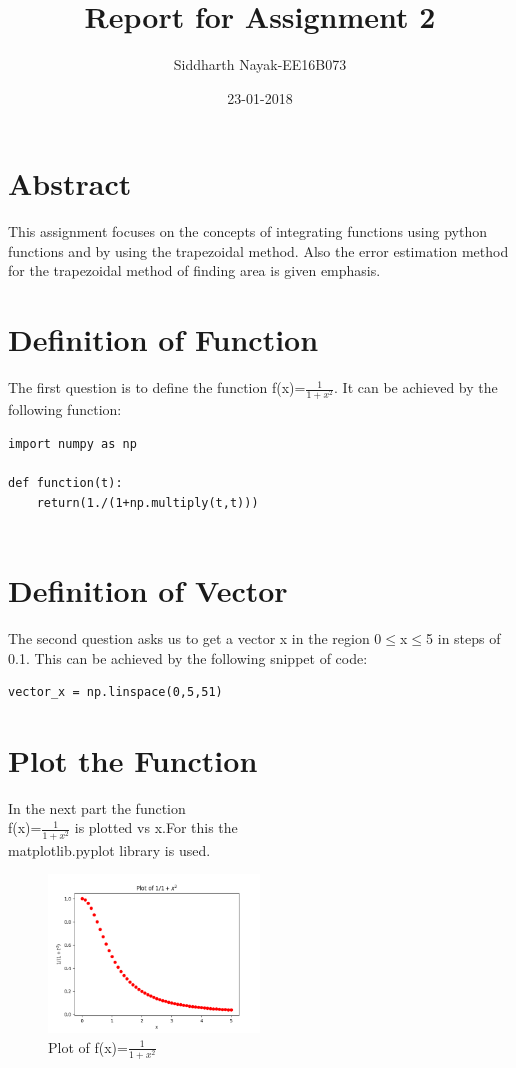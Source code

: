 \documentclass[11pt, a3paper, twocolumn]{article}
\title{Report for Assignment 2}
\date{23-01-2018}
\author{Siddharth Nayak-EE16B073}
\begin{document}
\maketitle
{}
\section{Abstract}
This assignment focuses on the concepts of integrating functions using python functions and by using the trapezoidal method. Also the error estimation method for the trapezoidal method of finding area is given emphasis.

\section{Definition of Function}
The first question is to define the function f(x)=$\frac{1}{1+x^2}$.
It can be achieved by the following function:
\begin{verbatim}
import numpy as np

def function(t):
    return(1./(1+np.multiply(t,t)))
	
\end{verbatim}

\section{Definition of Vector}
The second question asks us to get a vector x in the region 0$\leq$x$\leq$5 in steps of 0.1.
This can be achieved by the following snippet of code:
\begin{verbatim}
vector_x = np.linspace(0,5,51)
\end{verbatim}

\section{Plot the Function}
In the next part the function \\ f(x)=$\frac{1}{1+x^2}$
is plotted vs x.For this the\\ {\selectfont
matplotlib.pyplot} library is used.
\begin{figure}[h!]
\includegraphics[width=0.5\textwidth, right]{Fig1.png}
\caption{Plot of f(x)=$\frac{1}{1+x^2}$}
\end{figure}
\end{document}
